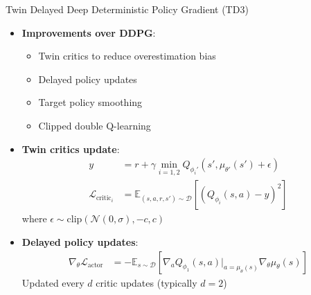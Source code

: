 \documentclass{beamer}
\begin{document}
\begin{frame}{Twin Delayed Deep Deterministic Policy Gradient (TD3)}
\begin{itemize}
    \item \textbf{Improvements over DDPG}:
    \begin{itemize}
        \item Twin critics to reduce overestimation bias
        \item Delayed policy updates
        \item Target policy smoothing
        \item Clipped double Q-learning
    \end{itemize}
    
    \item \textbf{Twin critics update}:
    \begin{align}
    y &= r + \gamma \min_{i=1,2} Q_{\phi_i'}(s', \mu_{\theta'}(s') + \epsilon) \\
    \mathcal{L}_{\text{critic}_i} &= \mathbb{E}_{(s,a,r,s') \sim \mathcal{D}}\left[(Q_{\phi_i}(s,a) - y)^2\right] 
    \end{align}
    where $\epsilon \sim \text{clip}(\mathcal{N}(0, \sigma), -c, c)$
    
    \item \textbf{Delayed policy updates}:
    \begin{align}
    \nabla_\theta \mathcal{L}_{\text{actor}} &= -\mathbb{E}_{s \sim \mathcal{D}}\left[\nabla_a Q_{\phi_1}(s,a)|_{a=\mu_\theta(s)} \nabla_\theta \mu_\theta(s)\right]
    \end{align}
    Updated every $d$ critic updates (typically $d=2$)
\end{itemize}
\end{frame}

    
\end{document}
